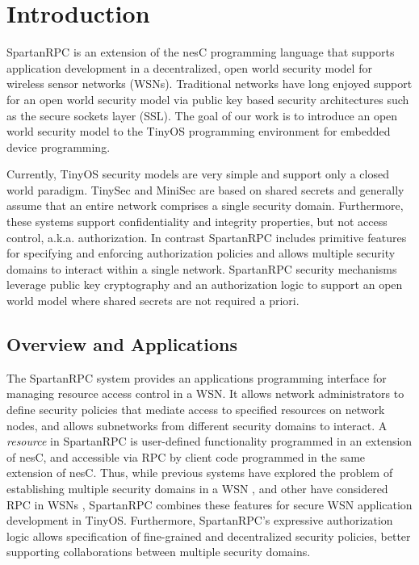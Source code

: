 \section{Introduction}
\label{section-intro}

SpartanRPC is an extension of the nesC programming language
\cite{Gay-nesC-2003} that supports application development in a
decentralized, open world security model for wireless sensor networks
(WSNs). Traditional networks have long enjoyed support for an open world
security model via public key based security architectures such as the
secure sockets layer (SSL). The goal of our work is to introduce an open
world security model to the TinyOS programming environment for embedded
device programming.

Currently, TinyOS security models are very simple and support only a
closed world paradigm. TinySec \cite{karlog-tinysec-2004} and MiniSec
\cite{luk-minisec-2007} are based on shared secrets and generally assume
that an entire network comprises a single security domain. Furthermore,
these systems support confidentiality and integrity properties, but not
access control, a.k.a. authorization. In contrast SpartanRPC includes
primitive features for specifying and enforcing authorization policies
and allows multiple security domains to interact within a single
network. SpartanRPC security mechanisms leverage public key cryptography
and an authorization logic to support an open world model where shared
secrets are not required a priori.

\subsection{Overview and Applications}
\label{section-overview}

The SpartanRPC system provides an applications programming interface for
managing resource access control in a WSN. It allows network
administrators to define security policies that mediate access to
specified resources on network nodes, and allows subnetworks from
different security domains to interact. A \emph{resource} in SpartanRPC
is user-defined functionality programmed in an extension of nesC, and
accessible via RPC by client code programmed in the same extension of
nesC. Thus, while previous systems have explored the problem of
establishing multiple security domains in a WSN
\cite{Claycomb:2011:NNL:1889383.1889450}, and other have considered RPC
in WSNs \cite{may-tinyrpc-2007}, SpartanRPC combines these features for
secure WSN application development in TinyOS. Furthermore, SpartanRPC's
expressive authorization logic allows specification of fine-grained and
decentralized security policies, better supporting collaborations
between multiple security domains.

